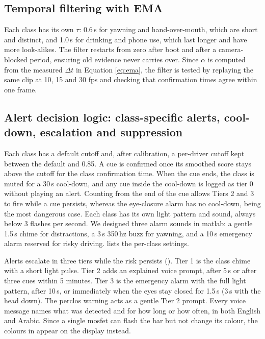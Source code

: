 \subsection{Temporal filtering with EMA}

Each class has its own $\tau$: 0.6\,s for yawning and hand-over-mouth, which are short and distinct, and 1.0\,s for drinking and phone use, which last longer and have more look-alikes. The filter restarts from zero after boot and after a camera-blocked period, ensuring old evidence never carries over. Since $\alpha$ is computed from the measured $\Delta t$ in Equation \ref{eq:ema}, the filter is tested by replaying the same clip at 10, 15 and 30 \gls{fps} and checking that confirmation times agree within one frame.

\subsection{Alert decision logic: class-specific alerts, cool-down, escalation and suppression}
\label{sec:decision}

Each class has a default cutoff and, after calibration, a per-driver cutoff kept between the default and 0.85. A cue is confirmed once its smoothed score stays above the cutoff for the class confirmation time. When the cue ends, the class is muted for a 30\,s cool-down, and any cue inside the cool-down is logged as tier 0 without playing an alert. Counting from the end of the cue allows Tiers 2 and 3 to fire while a cue persists, whereas the eye-closure alarm has no cool-down, being the most dangerous case. Each class has its own light pattern and sound, always below 3 flashes per second. We designed three alarm sounds in \gls{matlab}: a gentle 1.5\,s chime for distractions, a 3\,s 350\,\gls{hz} buzz for yawning, and a 10\,s emergency alarm reserved for risky driving.  lists the per-class settings.

Alerts escalate in three tiers while the risk persists (). Tier 1 is the class chime with a short light pulse. Tier 2 adds an explained voice prompt, after 5\,s or after three cues within 5 minutes. Tier 3 is the emergency alarm with the full light pattern, after 10\,s, or immediately when the eyes stay closed for 1.5\,s (3\,s with the head down). The \gls{perclos} warning acts as a gentle Tier 2 prompt. Every voice message names what was detected and for how long or how often, in both English and Arabic. Since a single \gls{mosfet} can flash the bar but not change its colour, the colours in  appear on the display instead.


